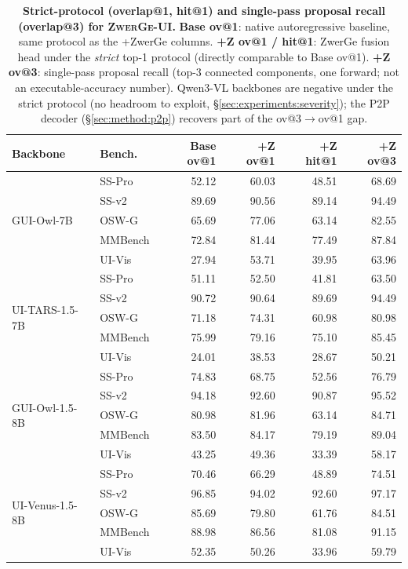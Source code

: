 
\begin{table}[t]
\centering
\caption{
  \textbf{Strict-protocol (overlap@1, hit@1) and single-pass proposal recall (overlap@3) for \textsc{ZwerGe-UI}.}
  \textbf{Base ov@1}: native autoregressive baseline, same protocol as the +ZwerGe columns.
  \textbf{+Z ov@1 / hit@1}: ZwerGe fusion head under the \emph{strict} top-1 protocol (directly comparable to Base ov@1).
  \textbf{+Z ov@3}: single-pass proposal recall (top-3 connected components, one forward; not an executable-accuracy number).
  Qwen3-VL backbones are negative under the strict protocol (no headroom to exploit, \S\ref{sec:experiments:severity}); the P2P decoder (\S\ref{sec:method:p2p}) recovers part of the ov@3$\to$ov@1 gap.
}
\label{tab:proposal_recall}
\small
\setlength{\tabcolsep}{4pt}
\begin{tabular}{l l r r r r}
\toprule
\textbf{Backbone} & \textbf{Bench.} & \textbf{Base ov@1} & \textbf{+Z ov@1} & \textbf{+Z hit@1} & \textbf{+Z ov@3} \\
\midrule
\multirow{5}{*}{GUI-Owl-7B}
 & SS-Pro   & 52.12 & 60.03 & 48.51 & 68.69 \\
 & SS-v2    & 89.69 & 90.56 & 89.14 & 94.49 \\
 & OSW-G    & 65.69 & 77.06 & 63.14 & 82.55 \\
 & MMBench  & 72.84 & 81.44 & 77.49 & 87.84 \\
 & UI-Vis   & 27.94 & 53.71 & 39.95 & 63.96 \\
\midrule
\multirow{5}{*}{UI-TARS-1.5-7B}
 & SS-Pro   & 51.11 & 52.50 & 41.81 & 63.50 \\
 & SS-v2    & 90.72 & 90.64 & 89.69 & 94.49 \\
 & OSW-G    & 71.18 & 74.31 & 60.98 & 80.98 \\
 & MMBench  & 75.99 & 79.16 & 75.10 & 85.45 \\
 & UI-Vis   & 24.01 & 38.53 & 28.67 & 50.21 \\
\midrule
\multirow{5}{*}{GUI-Owl-1.5-8B}
 & SS-Pro   & 74.83 & 68.75 & 52.56 & 76.79 \\
 & SS-v2    & 94.18 & 92.60 & 90.87 & 95.52 \\
 & OSW-G    & 80.98 & 81.96 & 63.14 & 84.71 \\
 & MMBench  & 83.50 & 84.17 & 79.19 & 89.04 \\
 & UI-Vis   & 43.25 & 49.36 & 33.39 & 58.17 \\
\midrule
\multirow{5}{*}{UI-Venus-1.5-8B}
 & SS-Pro   & 70.46 & 66.29 & 48.89 & 74.51 \\
 & SS-v2    & 96.85 & 94.02 & 92.60 & 97.17 \\
 & OSW-G    & 85.69 & 79.80 & 61.76 & 84.51 \\
 & MMBench  & 88.98 & 86.56 & 81.08 & 91.15 \\
 & UI-Vis   & 52.35 & 50.26 & 33.96 & 59.79 \\
\bottomrule
\end{tabular}
\end{table}


